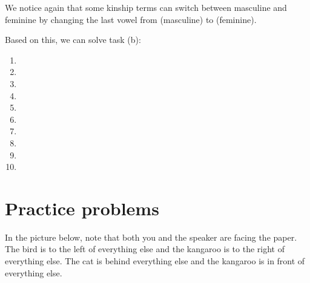 \begin{refsection}
\begin{mysolution}
We notice again that some kinship terms can switch between masculine and feminine by changing the last vowel from  (masculine) to  (feminine).

Based on this, we can solve task (b):
\begin{multicols}{3}
\begin{enumerate}[label = (\arabic*)]
    \item {}
    \item {}
    \item {}
    \item {}
    \item {}
    \item {}
    \item {}
    \item {}
    \item {}
    \item {}
\end{enumerate}
\end{multicols}
\end{mysolution}

\hypertarget{practice-problems}{%
\section{Practice problems}}

\begin{problem}{\langnameBardi}{\nameCSheard}{}
In the picture below, note that both you and the speaker are facing the paper. The bird is to the left of everything else and the kangaroo is to the right of everything else. The cat is behind everything else and the kangaroo is in front of everything else.


\end{problem}
\end{refsection}
